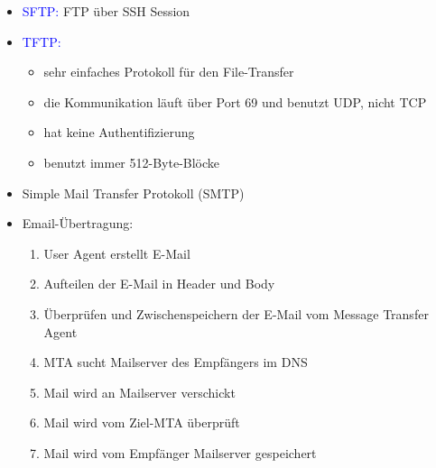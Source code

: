 \begin{itemize}
    \item \textcolor{blue}{SFTP:} FTP über SSH Session
    \item \textcolor{blue}{TFTP:}
    \begin{itemize}
        \item sehr einfaches Protokoll für den File-Transfer
        \item die Kommunikation läuft über Port 69 und benutzt UDP, nicht TCP
        \item hat keine Authentifizierung
        \item benutzt immer 512-Byte-Blöcke
    \end{itemize}
\end{itemize}

\begin{itemize}
    \item Simple Mail Transfer Protokoll (SMTP)
    \item Email-Übertragung:
    \begin{enumerate}
        \item User Agent erstellt E-Mail
        \item Aufteilen der E-Mail in Header und Body
        \item Überprüfen und Zwischenspeichern der E-Mail vom Message Transfer Agent
        \item MTA sucht Mailserver des Empfängers im DNS
        \item Mail wird an Mailserver verschickt
        \item Mail wird vom Ziel-MTA überprüft
        \item Mail wird vom Empfänger Mailserver gespeichert
    \end{enumerate}
\end{itemize}

